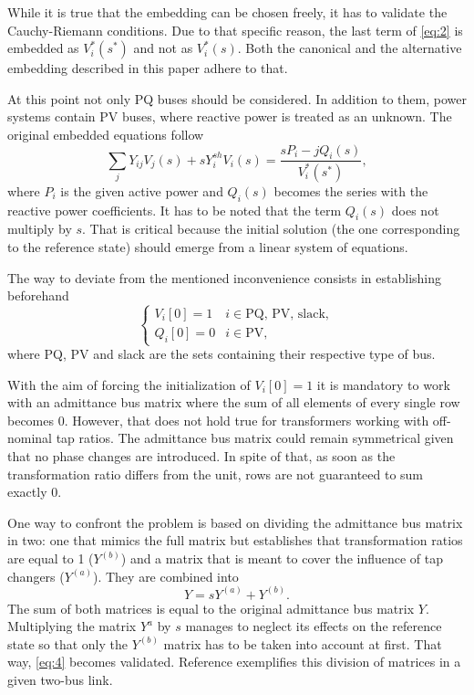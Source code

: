 \documentclass[journal]{IEEEtran}
\begin{document}
While it is true that the embedding can be chosen freely, it has to validate the Cauchy-Riemann conditions. Due to that specific reason, the last term of \eqref{eq:2} is embedded as $V^*_i(s^*)$ and not as $V^*_i(s)$. Both the canonical and the alternative embedding described in this paper adhere to that.  

At this point not only PQ buses should be considered. In addition to them, power systems contain PV buses, where reactive power is treated as an unknown. The original embedded equations follow
\begin{equation}
   \sum_{j} Y_{ij}V_j(s) + sY_i^{sh}V_i(s)=\frac{sP_i-jQ_i(s)}{V^*_i(s^*)},\label{eq:3}
\end{equation}
where $P_i$ is the given active power and $Q_i(s)$ becomes the series with the reactive power coefficients. It has to be noted that the term $Q_i(s)$ does not multiply by $s$. That is critical because the initial solution (the one corresponding to the reference state) should emerge from a linear system of equations. 

The way to deviate from the mentioned inconvenience consists in establishing beforehand
\begin{equation}
  \begin{cases}
  V_i[0]=1 & i\in \text{PQ, PV, slack},\\
  Q_i[0]=0 & i\in \text{PV},
  \end{cases}
  \label{eq:4}
\end{equation}
where PQ, PV and slack are the sets containing their respective type of bus.

With the aim of forcing the initialization of $V_i[0]=1$ it is mandatory to work with an admittance bus matrix where the sum of all elements of every single row becomes 0. However, that does not hold true for transformers working with off-nominal tap ratios. The admittance bus matrix could remain symmetrical given that no phase changes are introduced. In spite of that, as soon as the transformation ratio differs from the unit, rows are not guaranteed to sum exactly 0.

One way to confront the problem is based on dividing the admittance bus matrix in two: one that mimics the full matrix but establishes that transformation ratios are equal to 1 ($Y^{(b)}$) and a matrix that is meant to cover the influence of tap changers ($Y^{(a)}$). They are combined into
\begin{equation}
  Y=sY^{(a)}+Y^{(b)}.\label{eq:5}
\end{equation}
The sum of both matrices is equal to the original admittance bus matrix $Y$. 
Multiplying the matrix $Y^{a}$ by $s$ manages to neglect its effects on the reference state so that only the $Y^{(b)}$ matrix has to be taken into account at first. That way, \eqref{eq:4} becomes validated. Reference \cite{Tylavsky2} exemplifies this division of matrices in a given two-bus link.
\end{document}
